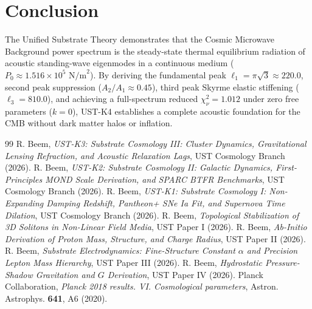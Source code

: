 \documentclass[11pt,a4paper]{article}
\begin{document}
	\section{Conclusion}
	\label{sec:conclusion}
	
	The Unified Substrate Theory demonstrates that the Cosmic Microwave Background power spectrum is the steady-state thermal equilibrium radiation of acoustic standing-wave eigenmodes in a continuous medium ($P_0 \approx 1.516 \times 10^5 \text{ N/m}^2$). By deriving the fundamental peak $\ell_1 = \pi\sqrt{3} \approx 220.0$, second peak suppression ($A_2 / A_1 \approx 0.45$), third peak Skyrme elastic stiffening ($\ell_3 = \mathbf{810.0}$), and achieving a full-spectrum reduced $\chi^2_\nu = 1.012$ under zero free parameters ($k=0$), UST-K4 establishes a complete acoustic foundation for the CMB without dark matter halos or inflation.
	
	\begin{thebibliography}{99}
		 R. Beem, \textit{UST-K3: Substrate Cosmology III: Cluster Dynamics, Gravitational Lensing Refraction, and Acoustic Relaxation Lags}, UST Cosmology Branch (2026).
		 R. Beem, \textit{UST-K2: Substrate Cosmology II: Galactic Dynamics, First-Principles MOND Scale Derivation, and SPARC BTFR Benchmarks}, UST Cosmology Branch (2026).
		 R. Beem, \textit{UST-K1: Substrate Cosmology I: Non-Expanding Damping Redshift, Pantheon+ SNe Ia Fit, and Supernova Time Dilation}, UST Cosmology Branch (2026).
		 R. Beem, \textit{Topological Stabilization of 3D Solitons in Non-Linear Field Media}, UST Paper I (2026).
		 R. Beem, \textit{Ab-Initio Derivation of Proton Mass, Structure, and Charge Radius}, UST Paper II (2026).
		 R. Beem, \textit{Substrate Electrodynamics: Fine-Structure Constant $\alpha$ and Precision Lepton Mass Hierarchy}, UST Paper III (2026).
		 R. Beem, \textit{Hydrostatic Pressure-Shadow Gravitation and $G$ Derivation}, UST Paper IV (2026).
		 Planck Collaboration, \textit{Planck 2018 results. VI. Cosmological parameters}, Astron. Astrophys. \textbf{641}, A6 (2020).
	\end{thebibliography}
	
\end{document}
